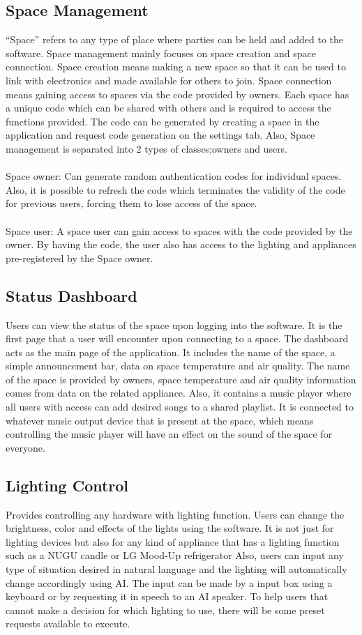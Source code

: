 \documentclass[conference]{IEEEtran}
\begin{document}
    \subsection{Space Management}
    “Space” refers to any type of place where parties can be held and added to the software. Space management mainly focuses on space creation and space connection. Space creation means making a new space so that it can be used to link with electronics and made available for others to join. Space connection means gaining access to spaces via the code provided by owners. Each space has a unique code which can be shared with others and is required to access the functions provided. The code can be generated by creating a space in the application and request code generation on the settings tab. Also, Space management is separated into 2 types of classes;owners and users.\\ \\
    Space owner: Can generate random authentication codes for individual spaces. Also, it is possible to refresh the code which terminates the validity of the code for previous users, forcing them to lose access of the space.\\ \\
    Space user: A space user can gain access to spaces with the code provided by the owner. By having the code, the user also has access to the lighting and appliances pre-registered by the Space owner.

    \subsection{Status Dashboard}
    Users can view the status of the space upon logging into the software. It is the first page that a user will encounter upon connecting to a space. The dashboard acts as the main page of the application. It includes the name of the space, a simple announcement bar, data on space temperature and air quality. The name of the space is provided by owners, space temperature and air quality information comes from data on the related appliance. Also, it contains a music player where all users with access can add desired songs to a shared playlist. It is connected to whatever music output device that is present at the space, which means controlling the music player will have an effect on the sound of the space for everyone. 

    \subsection{Lighting Control}
    Provides controlling any hardware with lighting function. Users can change the brightness, color and effects of the lights using the software. It is not just for lighting devices but also for any kind of appliance that has a lighting function such as a NUGU candle or LG Mood-Up refrigerator Also, users can input any type of situation desired in natural language and the lighting will automatically change accordingly using AI. The input can be made by a input box using a keyboard or by requesting it in speech to an AI speaker. To help users that cannot make a decision for which lighting to use, there will be some preset requests available to execute.
\end{document}
